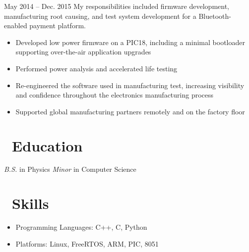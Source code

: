 \documentclass{resume}
\begin{document}
          {May 2014 -- Dec. 2015}
My responsibilities included firmware development, manufacturing
root causing, and test system development for a Bluetooth-enabled payment platform.
\begin{itemize}
  \item Developed low power firmware on a PIC18, including
      a minimal bootloader supporting over-the-air application upgrades
  \item Performed power analysis and accelerated life testing
  \item Re-engineered the software used in manufacturing test, increasing visibility
        and confidence throughout the electronics manufacturing process
  \item Supported global manufacturing partners remotely and on the factory floor
\end{itemize}
\vspace{3mm}

\section{\faGraduationCap\ Education}
\textit{B.S.} in Physics
\newline
\textit{Minor} in Computer Science

\section{\faCogs\ Skills}
\begin{itemize}[parsep=0.5ex]
  \item Programming Languages: C++, C, Python
  \item Platforms: Linux, FreeRTOS, ARM, PIC, 8051
\end{itemize}
\end{document}
